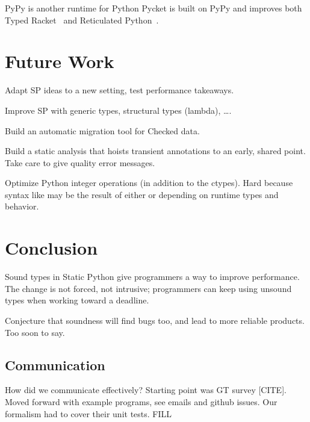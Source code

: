\documentclass[a4paper,english,cleveref,autoref,thm-restate,anonymous,]{lipics-v2021}
\begin{document}
PyPy is another runtime for Python
Pycket is built on PyPy and improves both Typed Racket~\cite{bbst-oopsla-2017}
and Reticulated Python~\cite{vsc-dls-2019}.


\section{Future Work}
\label{s:future}

Adapt SP ideas to a new setting, test performance takeaways.

Improve SP with generic types, structural types (lambda), \ldots.

Build an automatic migration tool for Checked data.

Build a static analysis that hoists transient annotations to an early, shared point.
Take care to give quality error messages.

Optimize Python integer operations (in addition to the ctypes).
Hard because syntax like  may be the result of either 
or  depending on runtime types and behavior.


\section{Conclusion}
\label{s:conclusion}

Sound types in Static Python give programmers a way to improve performance.
The change is not forced, not intrusive;
programmers can keep using unsound types when working toward a deadline.

Conjecture that soundness will find bugs too, and lead to more reliable products.
Too soon to say.


\subsection{Communication}

How did we communicate effectively?
Starting point was GT survey [CITE].
Moved forward with example programs, see emails and github issues.
Our formalism had to cover their unit tests.
FILL




\end{document}
